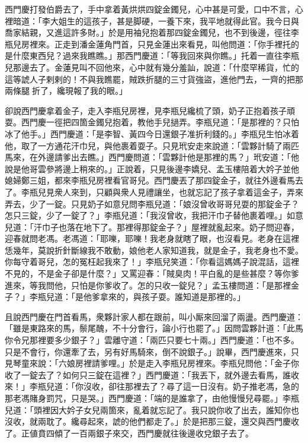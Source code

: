 西門慶打發伯爵去了，手中拿着黃烘烘四錠金鐲兒，心中甚是可愛，口中不言，心裡暗道：「李大姐生的這孩子，甚是脚硬，一養下來，我平地就得此官。我今日與喬家結親，又進這許多財。」於是用袖兒抱着那四錠金鐲兒，也不到後邊，徑往李瓶兒房裡來。正走到潘金蓮角門首，只見金蓮出來看見，叫他問道：「你手裡托的是什麼東西兒？過來我瞧瞧。」那西門慶道：「等我回來與你瞧。」托着一直往李瓶兒那邊去了。{}金蓮見叫不回他來，心中就有幾分羞訕，說道：「什麼罕稀貨，忙的這等諕人子剌剌的！不與我瞧罷，賊跌折腿的三寸貨強盜，進他門去，一齊的把那兩條腿𢱉折了，纔現報了我的眼。」

卻說西門慶拿着金子，走入李瓶兒房裡，見李瓶兒纔梳了頭，奶子正抱着孩子頑耍。西門慶一徑把四箇金鐲兒抱着，教他手兒撾弄。李瓶兒道：「是那裡的？只怕冰了他手。」西門慶道：「是李智、黃四今日還銀子准折利錢的。」李瓶兒生怕冰着他，取了一方通花汗巾兒，與他裹着耍子。只見玳安走來說道：「雲夥計騎了兩匹馬來，在外邊請爹出去瞧。」西門慶問道：「雲夥計他是那裡的馬？」玳安道：「他說是他哥雲參將邊上稍來的。」正說着，只見後邊李嬌兒、孟玉樓陪着大妗子並他媳婦鄭三姐，都來李瓶兒房裡看官哥兒。西門慶丟了那四錠金子，就往外邊看馬去了。李瓶兒見衆人來到，只顧與衆人見禮讓坐，也就忘記了孩子拿着這金子，弄來弄去，少了一錠。只見奶子如意兒問李瓶兒道：「娘沒曾收哥哥兒耍的那錠金子？怎只三錠，少了一錠了？」李瓶兒道：「我沒曾收，我把汗巾子替他裹着哩。」如意兒道：「汗巾子也落在地下了。那裡得那錠金子？」屋裡就亂起來。奶子問迎春，迎春就問老馮。老馮道：「耶嚛，耶嚛！我老身就瞎了眼，也沒看見。老身在這裡恁幾年，莫說折針斷線我不敢動，娘他老人家知道我，就是金子，我老身也不愛。你每守着哥兒，怎的冤枉起我來了！」李瓶兒笑道：「你看這媽媽子說混話，這裡不見的，不是金子卻是什麼？」又罵迎春：「賊臭肉！平白亂的是些甚麼？等你爹進來，等我問他，只怕是你爹收了。怎的只收一錠兒？」孟玉樓問道：「是那裡金子？」李瓶兒道：「是他爹拿來的，與孩子耍。誰知道是那裡的。」

且說西門慶在門首看馬，衆夥計家人都在跟前，叫小厮來回溜了兩盪。西門慶道：「雖是東路來的馬，鬃尾醜，不十分會行，論小行也罷了。」因問雲夥計道：「此馬你令兄那裡要多少銀子？」雲離守道：「兩匹只要七十兩。」西門慶道：「也不多。只是不會行，你還牽了去，另有好馬騎來，倒不說銀子。」說畢，西門慶進來，只見琴童來說：「六娘房裡請爹哩。」於是走入李瓶兒房裡來。李瓶兒問他：「金子你收了一錠去了？如何只三錠在這裡？」西門慶道：「我丟下，就外邊去看馬，誰收來！」李瓶兒道：「你沒收，卻往那裡去了？尋了這一日沒有。奶子推老馮，急的那老馮賭身罰咒，只是哭。」西門慶道：「端的是誰拿了，由他慢慢兒尋罷。」李瓶兒道：「頭裡因大妗子女兒兩箇來，亂着就忘記了。我只說你收了出去，誰知你也沒收，就兩耽了。纔尋起來，諕的他們都走了。」於是把那三錠，還交與西門慶收了。正値賁四傾了一百兩銀子來交，西門慶就往後邊收兌銀子去了。

